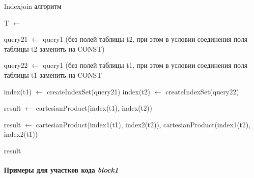 \begin{algorithm}[h!]
\caption{Indexjoin алгоритм}
\label{alg:indexjoin}

\begin{algorithmic}[1]

    \State T $\gets$ 
    \Statex 
    
    \Else
    \EndIf
    \Statex 

    \State query21 $\gets$ query1 (без полей таблицы t2, при этом в условии соединения поля таблицы t2 заменить на CONST)
    \Statex

    \State query22 $\gets$ query1 (без полей таблицы t1, при этом в условии соединения поля таблицы t1 заменить на CONST
    \Statex

    \State index(t1) $\gets$ createIndexSet(query21)
    \State index(t2) $\gets$ createIndexSet(query22)
    \Statex

    
    \Statex{}

        \Statex
        \State result $\gets$ cartesianProduct(index(t1), index(t2))
    \Statex{}
    \Else
    \Statex{}
        
        \Statex

        \Statex
        \State result $\gets$ cartesianProduct(index1(t1), index2(t2)), cartesianProduct(index1(t2), index2(t1))
    \Statex{}
    \EndIf

    \Statex
    \State \Return result
\EndFunction
\end{algorithmic}

\end{algorithm}


\paragraph{Примеры для участков кода \textit{block1}}

